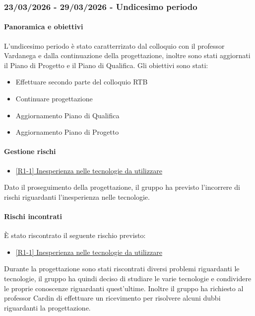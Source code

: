 \documentclass[a4paper,12pt]{article}
\begin{document}
        \subsubsection{23/03/2026 - 29/03/2026 - Undicesimo periodo}
            \paragraph{Panoramica e obiettivi}
            L'undicesimo periodo è stato caratterrizato dal colloquio con il professor Vardanega e dalla continuazione della progettazione, inoltre sono stati aggiornati il Piano di Progetto e il Piano di Qualifica.  Gli obiettivi sono stati:
            \begin{itemize}
                \item Effettuare secondo parte del colloquio RTB
                \item Continuare progettazione
                \item Aggiornamento Piano di Qualifica
                \item Aggiornamento Piano di Progetto
            \end{itemize}
            
            \paragraph{Gestione rischi}
                \begin{itemize}
                \item\hyperref[tab:r1]{[R1-1] Inesperienza nelle tecnologie da utilizzare}
                \end{itemize}
                Dato il proseguimento della progettazione, il gruppo ha previsto l'incorrere di rischi riguardanti l'inesperienza nelle tecnologie.
    
                \paragraph*{Rischi incontrati}
                È stato riscontrato il seguente rischio previsto:
                \begin{itemize}
                    \item \hyperref[tab:r1]{[R1-1] Inesperienza nelle tecnologie da utilizzare}
                \end{itemize}
                Durante la progettazione sono stati riscontrati diversi problemi riguardanti le tecnologie, il gruppo ha quindi deciso di studiare le varie tecnologie e condividere le proprie conoscenze riguardanti quest'ultime.
                Inoltre il gruppo ha richiesto al professor Cardin di effettuare un ricevimento per risolvere alcuni dubbi riguardanti la progettazione.
                
\end{document}
